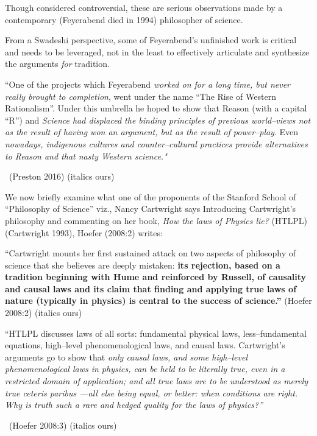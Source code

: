 \vskip 2pt

Though considered controversial, these are serious observations made by a contemporary (Feyerabend died in 1994) philosopher of science.

\vskip 2pt

From a Swadeshi perspective, some of Feyerabend’s unfinished work is critical and needs to be leveraged, not in the least to effectively articulate and synthesize the arguments \textit{for} tradition.

\vskip 2pt

\begin{myquote}
“One of the projects which Feyerabend \textit{worked on for a long time, but never really brought to completion}, went under the name “The Rise of Western Rationalism”. Under this umbrella he hoped to show that Reason (with a capital “R”) and \textit{Science had displaced the binding principles of previous world–views not as the result of having won an argument, but as the result of power–play}. Even \textit{nowadays, indigenous cultures and counter–cultural practices provide alternatives to Reason and that nasty Western science."} 

~\hfill (Preston 2016) (italics ours)
\end{myquote}

\vskip 2pt

We now briefly examine what one of the proponents of the Stanford School of “Philosophy of Science” viz., Nancy Cartwright says Introducing Cartwright’s philosophy and commenting on her book, \textit{How the laws of Physics lie?} (HTLPL) (Cartwright 1993), Hoefer (2008:2) writes:

\vskip 2pt

\begin{myquote}
“Cartwright mounts her first sustained attack on two aspects of philosophy of science that she believes are deeply mistaken: \textbf{its rejection, based on a tradition beginning with Hume and reinforced by Russell, of causality and causal laws and its claim that finding and applying true laws of nature (typically in physics) is central to the success of science.”} \hfill (Hoefer 2008:2) (italics ours)
\end{myquote}

\vskip 2pt

\begin{myquote}
“HTLPL discusses laws of all sorts: fundamental physical laws, less–fundamental equations, high–level phenomenological laws, and causal laws. Cartwright’s arguments go to show that \textit{only causal laws, and some high–level phenomenological laws in physics, can be held to be literally true, even in a restricted domain of application; and all true laws are to be understood as merely true ceteris paribus —all else being equal, or better: when conditions are right. Why is truth such a rare and hedged quality for the laws of physics?”} 

~\hfill (Hoefer 2008:3) (italics ours)
\end{myquote}

